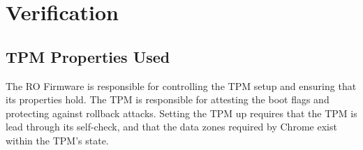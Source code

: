 \documentclass[../report.tex]{subfiles}
\begin{document}
\onehalfspacing

\pagebreak
\section{Verification}

%
%

\subsection{TPM Properties Used}

The RO Firmware is responsible for controlling the TPM setup and ensuring that its properties hold. 
The TPM is responsible for attesting the boot flags and protecting against rollback attacks. 
Setting the TPM up requires that the TPM is lead through its self-check, and that the data zones required by Chrome exist within the TPM's state.
\end{document}
